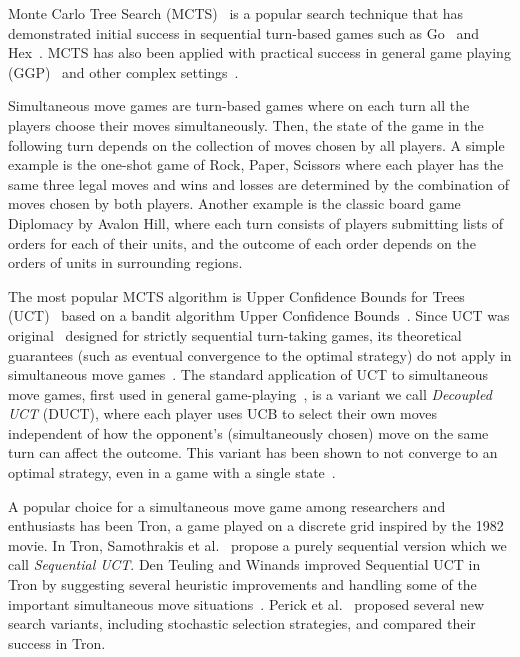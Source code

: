 \documentclass[conference]{IEEEtran}
\begin{document}
Monte Carlo Tree Search (MCTS)~\cite{Coulom06Efficient,Kocsis06Bandit} is a popular search technique 
that has demonstrated initial success in sequential turn-based games such as Go~\cite{Gelly12} and Hex~\cite{Arneson10Hex}.
 MCTS has also been applied with practical success in general game playing (GGP)~\cite{Bjornsson09CadiaPlayer} and other 
complex settings~\cite{Browne12MCTSSurvey}. 

Simultaneous move games are turn-based games where on each turn all the players choose their moves simultaneously.
Then, the state of the game in the following turn depends on the collection of moves chosen by all players. 
A simple example is the one-shot game of Rock, Paper, Scissors where each player has the same three legal moves 
and wins and losses are determined by the combination of moves chosen by both players. 
Another example is the classic board game Diplomacy by Avalon Hill, where each turn consists of players submitting 
lists of orders for each of their units, and the outcome of each order depends on the orders of units in surrounding regions. 

The most popular MCTS algorithm is Upper Confidence Bounds for Trees (UCT)~\cite{Kocsis06Bandit} based on a bandit algorithm 
Upper Confidence Bounds~\cite{Auer02Finite}. Since UCT was original~\cite{Shafiei09} 
designed for strictly sequential turn-taking games, its theoretical guarantees (such as eventual convergence to the optimal 
strategy) do not apply in simultaneous move games~\cite{Shafiei09}. The standard application of UCT to simultaneous move games, 
first used in general game-playing~\cite{Cadiaplayer}, is a variant we call {\it Decoupled UCT} (DUCT), where each player uses UCB to select 
their own moves independent of how the opponent's (simultaneously chosen) move on the same turn can affect the outcome. 
This variant has been shown to not converge to an optimal strategy, even in a game with a single state~\cite{Shafiei09}.

A popular choice for a simultaneous move game among researchers and enthusiasts has been Tron, a game played on a discrete 
grid inspired by the 1982 movie.
In Tron, Samothrakis et al.~\cite{Samothrakis10Tron} propose a purely sequential version which we call {\it Sequential UCT}. 
Den Teuling and Winands improved Sequential UCT in Tron by suggesting several heuristic improvements and handling some of the 
important simultaneous move situations~\cite{DenTeuling12Tron}. Perick et al.~\cite{Perick12Comparison} proposed several new 
search variants, including stochastic selection strategies, and compared their success in Tron. 
\end{document}

